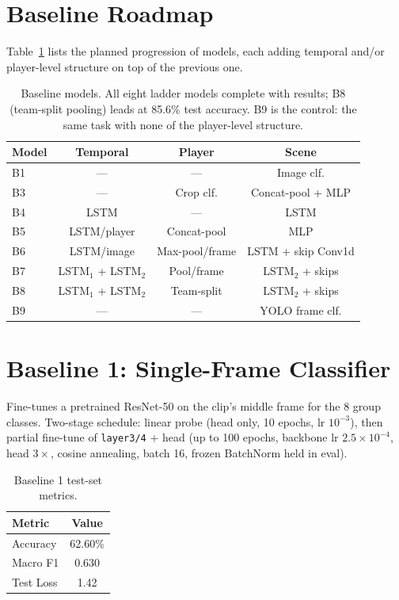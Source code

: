 \documentclass[9pt,a4paper,twocolumn,twoside]{tau-class/tau}
\begin{document}
\section{Baseline Roadmap}

Table~\ref{tab:baselines} lists the planned progression of models, each adding temporal and/or player-level structure on top of the previous one.

\begin{table}[h]
    \centering
    \caption{Baseline models. All eight ladder models complete with results; B8 (team-split pooling) leads at 85.6\% test accuracy. B9 is the control: the same task with none of the player-level structure.}
    \label{tab:baselines}
    \begin{tabular}{lccc}
        \toprule
        \textbf{Model} & \textbf{Temporal} & \textbf{Player} & \textbf{Scene} \\
        \midrule
        B1 & --- & --- & Image clf. \\
        B3 & --- & Crop clf. & Concat-pool + MLP \\
        B4 & LSTM & --- & LSTM \\
        B5 & LSTM/player & Concat-pool & MLP \\
        B6 & LSTM/image & Max-pool/frame & LSTM + skip Conv1d \\
        B7 & LSTM$_1$ + LSTM$_2$ & Pool/frame & LSTM$_2$ + skips \\
        B8 & LSTM$_1$ + LSTM$_2$ & Team-split & LSTM$_2$ + skips \\
        \midrule
        B9 & --- & --- & YOLO frame clf. \\
        \bottomrule
    \end{tabular}
\end{table}

\section{Baseline 1: Single-Frame Classifier}

Fine-tunes a pretrained ResNet-50 on the clip's middle frame for the 8 group classes. Two-stage schedule: linear probe (head only, 10 epochs, lr $10^{-3}$), then partial fine-tune of \texttt{layer3/4} + head (up to 100 epochs, backbone lr $2.5 \times 10^{-4}$, head $3\times$, cosine annealing, batch 16, frozen BatchNorm held in eval).

\begin{table}[h]
    \centering
    \caption{Baseline 1 test-set metrics.}
    \label{tab:b1-metrics}
    \begin{tabular}{lc}
        \toprule
        \textbf{Metric} & \textbf{Value} \\
        \midrule
        Accuracy   & 62.60\% \\
        Macro F1   & 0.630 \\
        Test Loss  & 1.42 \\
        \bottomrule
    \end{tabular}
\end{table}
\end{document}
